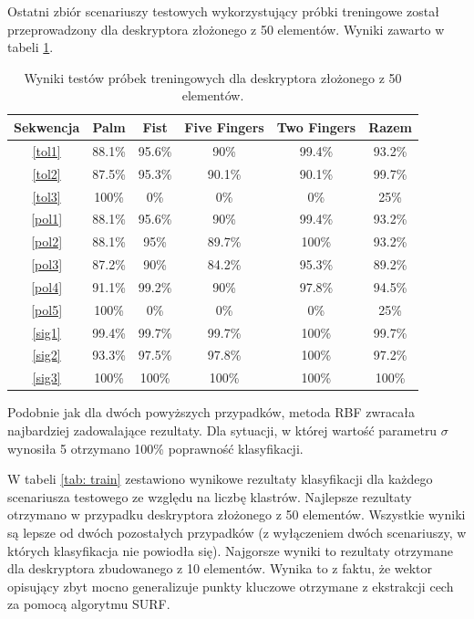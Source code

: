 Ostatni zbiór scenariuszy testowych wykorzystujący próbki treningowe został przeprowadzony dla deskryptora złożonego z 50 elementów. Wyniki zawarto w tabeli \ref{tab: train50}.
\begin{table} [h!]
	\centering
	\begin{tabular}{|c|c|c|c|c|c|}
		\hline
		\textbf{Sekwencja} 	& \textbf{Palm} & \textbf{Fist} & \textbf{Five Fingers} & \textbf{Two Fingers} & \textbf{Razem} \\ \hline
		\ref{tol1} 	& 88.1\% 		& 95.6\%		& 90\%		& 99.4\% 	& 93.2\% \\ \hline
		\ref{tol2} 	& 87.5\% 		& 95.3\%		& 90.1\%	& 90.1\% 	& 99.7\% \\ \hline
		\ref{tol3}	& 100\%			& 0\%			& 0\%		& 0\% 		& 25\% \\ \hline \hline
		\ref{pol1} 	& 88.1\% 		& 95.6\%		& 90\%		& 99.4\% 	& 93.2\% \\ \hline
		\ref{pol2} 	& 88.1\% 		& 95\%			& 89.7\%	& 100\% 	& 93.2\% \\ \hline
		\ref{pol3}	& 87.2\%		& 90\%			& 84.2\%	& 95.3\% 	& 89.2\% \\ \hline
		\ref{pol4}	& 91.1\%		& 99.2\%		& 90\%		& 97.8\% 	& 94.5\% \\ \hline
		\ref{pol5}	& 100\%			& 0\%			& 0\%		& 0\% 		& 25\% \\ \hline \hline
		\ref{sig1}	& 99.4\% 		& 99.7\%		& 99.7\%	& 100\% 	& 99.7\% \\ \hline
		\ref{sig2}	& 93.3\% 		& 97.5\%		& 97.8\%	& 100\% 	& 97.2\% \\ \hline
		\ref{sig3}	& 100\%			& 100\%			& 100\%		& 100\% 	& 100\% \\ \hline
	\end{tabular}
	\caption{Wyniki testów próbek treningowych dla deskryptora złożonego z 50 elementów.}
	\label{tab: train50}
\end{table}
Podobnie jak dla dwóch powyższych przypadków, metoda RBF zwracała najbardziej zadowalające rezultaty. Dla sytuacji, w której wartość parametru $\sigma$ wynosiła 5 otrzymano 100\% poprawność klasyfikacji. 

W tabeli \ref{tab: train} zestawiono wynikowe rezultaty klasyfikacji dla każdego scenariusza testowego ze względu na liczbę klastrów. Najlepsze rezultaty otrzymano w przypadku deskryptora złożonego z 50 elementów. Wszystkie wyniki są lepsze od dwóch pozostałych przypadków (z wyłączeniem dwóch scenariuszy, w których klasyfikacja nie powiodła się). Najgorsze wyniki to rezultaty otrzymane dla deskryptora zbudowanego z 10 elementów. Wynika to z faktu, że wektor opisujący zbyt mocno generalizuje punkty kluczowe otrzymane z ekstrakcji cech za pomocą algorytmu SURF.  

